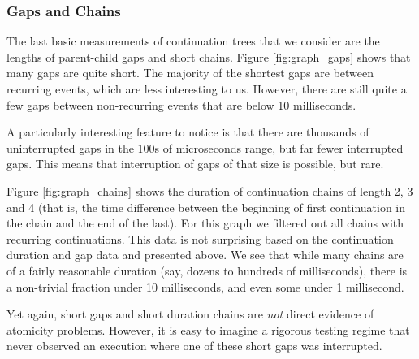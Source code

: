 \documentclass[acmsmall,anonymous,review]{acmart}\settopmatter{printfolios=true,printccs=false,printacmref=false}
\begin{document}
\subsubsection{Gaps and Chains}

The last basic measurements of continuation trees that we consider are the lengths of parent-child gaps and short chains.
Figure \ref{fig:graph_gaps} shows that many gaps are quite short.
The majority of the shortest gaps are between recurring events, which are less interesting to us.
However, there are still quite a few gaps between non-recurring events that are below 10 milliseconds.

A particularly interesting feature to notice is that there are thousands of uninterrupted gaps in the 100s of microseconds range, but far fewer interrupted gaps.
This means that interruption of gaps of that size is possible, but rare.

Figure \ref{fig:graph_chains} shows the duration of continuation chains of length 2, 3 and 4 (that is, the time difference between the beginning of first continuation in the chain and the end of the last).
For this graph we filtered out all chains with recurring continuations.
This data is not surprising based on the continuation duration and gap data and presented above.
We see that while many chains are of a fairly reasonable duration (say, dozens to hundreds of milliseconds), there is a non-trivial fraction under 10 milliseconds, and even some under 1 millisecond.

Yet again, short gaps and short duration chains are \emph{not} direct evidence of atomicity problems.
However, it is easy to imagine a rigorous testing regime that never observed an execution where one of these short gaps was interrupted.
\end{document}
